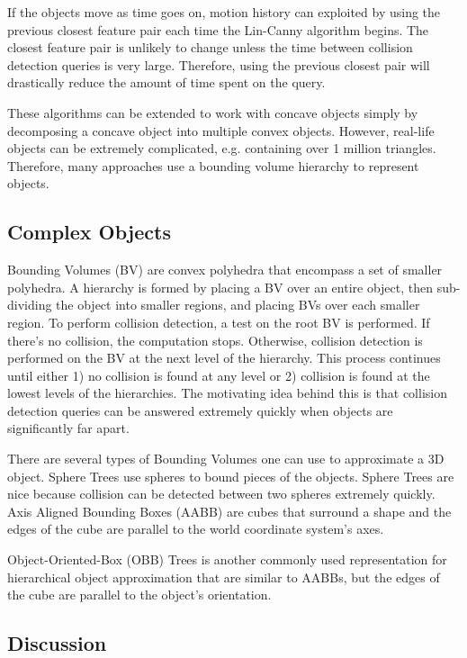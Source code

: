 \documentclass[10pt,conference]{ieeeconf}
\begin{document}
	If the objects move as time goes on, motion history can exploited by using the previous closest feature pair each time the Lin-Canny algorithm begins. The closest feature pair is unlikely to change unless the time between collision detection queries is very large. Therefore, using the previous closest pair will drastically reduce the amount of time spent on the query. 
	
	These algorithms can be extended to work with concave objects simply by decomposing a concave object into multiple convex objects. However, real-life objects can be extremely complicated, e.g. containing over 1 million triangles. Therefore, many approaches use a bounding volume hierarchy to represent objects.
	
\subsection{Complex Objects}

	Bounding Volumes (BV) are convex polyhedra	that encompass a set of smaller polyhedra. A hierarchy is formed by placing a BV over an entire object, then sub-dividing the object into smaller regions, and placing BVs over each smaller region. To perform collision detection, a test on the root BV is performed. If there's no collision, the computation stops. Otherwise, collision detection is performed on the BV at the next level of the hierarchy. This process continues until either 1) no collision is found at any level or 2) collision is found at the lowest levels of the hierarchies. The motivating idea behind this is that collision detection queries can be answered extremely quickly when objects are significantly far apart. 
	
	There are several types of Bounding Volumes one can use to approximate a 3D object. Sphere Trees \cite{hubbard1996approximating} use spheres to bound pieces of the objects. Sphere Trees are nice because collision can be detected between two spheres extremely quickly. Axis Aligned Bounding Boxes (AABB) \cite{edelsbrunner1981intersection} are cubes that surround a shape and the edges of the cube are parallel to the world coordinate system's axes.
	
	Object-Oriented-Box (OBB) Trees \cite{gottschalk1996obbtree} is another commonly used representation for hierarchical object approximation that are similar to AABBs, but the edges of the cube are parallel to the object's orientation.
	 
	
\subsection{Discussion}
\end{document}
